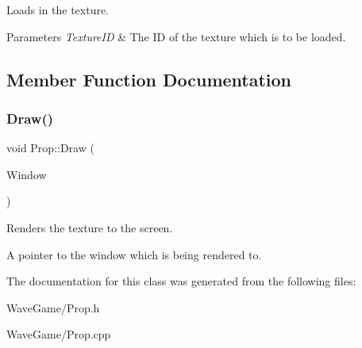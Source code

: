 Loads in the texture. 


\begin{DoxyParams}{Parameters}
{\em Texture\+ID} & The ID of the texture which is to be loaded.\\
\hline
\end{DoxyParams}


\subsection{Member Function Documentation}
\mbox{\label{class_prop_a55c4fb13383f6f5edc7b64066b0c2bc4}} 
\subsubsection{\texorpdfstring{Draw()}{Draw()}}
{\footnotesize\ttfamily void Prop\+::\+Draw (\begin{DoxyParamCaption}\item[{Render\+Window $\ast$}]{Window }\end{DoxyParamCaption})}



Renders the texture to the screen. 

A pointer to the window which is being rendered to.

The documentation for this class was generated from the following files\+:\begin{DoxyCompactItemize}
\item 
Wave\+Game/Prop.\+h\item 
Wave\+Game/Prop.\+cpp\end{DoxyCompactItemize}
